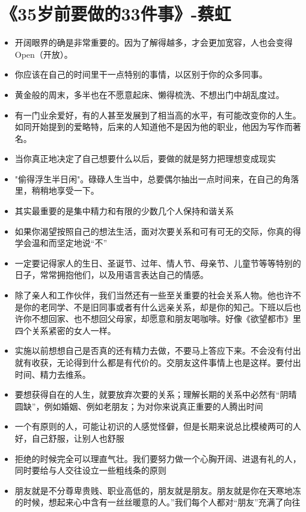 \documentclass[UTF8,a4paper,8pt]{ctexbook}
\begin{document}
	\newpage
	\section{《35岁前要做的33件事》-蔡虹 }
		\begin{itemize}
			\item 开阔眼界的确是非常重要的。因为了解得越多，才会更加宽容，人也会变得Open（开放）。
			\item 你应该在自己的时间里干一点特别的事情，以区别于你的众多同事。
			\item 黄金般的周末，多半也在不愿意起床、懒得梳洗、不想出门中胡乱度过。
			\item 有一门业余爱好，有的人甚至发展到了相当高的水平，有可能改变你的人生。如同开始提到的爱略特，后来的人知道他不是因为他的职业，他因为写作而著名。
			\item 当你真正地决定了自己想要什么以后，要做的就是努力把理想变成现实
			\item "偷得浮生半日闲"。碌碌人生当中，总要偶尔抽出一点时间来，在自己的角落里，稍稍地享受一下。
			\item 其实最重要的是集中精力和有限的少数几个人保持和谐关系
			\item 如果你渴望按照自己的想法生活，面对次要关系和可有可无的交际，你真的得学会温和而坚定地说“不”
			\item 一定要记得家人的生日、圣诞节、过年、情人节、母亲节、儿童节等等特别的日子，常常拥抱他们，以及用语言表达自己的情感。
			\item 除了亲人和工作伙伴，我们当然还有一些至关重要的社会关系人物。他也许不是你的老同学、不是旧同事或者有什么远亲关系，却是你的知己。下班以后也许你不想回家、也不想回父母家，却愿意和朋友喝咖啡。好像《欲望都市》里四个关系紧密的女人一样。
			\item 实施以前想想自己是否真的还有精力去做，不要马上答应下来。不会没有付出就有收获，无论得到什么都是有代价的。交朋友这件事情上也是这样。要付出时间、精力去维系。
			\item 要想获得自在的人生，就要放弃次要的关系；理解长期的关系中必然有“阴晴圆缺”，例如婚姻、例如老朋友；为对你来说真正重要的人腾出时间
			\item 一个有原则的人，可能让初识的人感觉怪僻，但是长期来说总比模棱两可的人好，自己舒服，让别人也舒服
			\item 拒绝的时候完全可以理直气壮。我们要努力做一个心胸开阔、进退有礼的人，同时要给与人交往设立一些粗线条的原则
			\item 朋友就是不分尊卑贵贱、职业高低的，朋友就是朋友。朋友就是你在天寒地冻的时候，想起来心中含有一丝丝暖意的人。”我们每个人都对“朋友”充满了向往
		\end{itemize}
		
\end{document}
